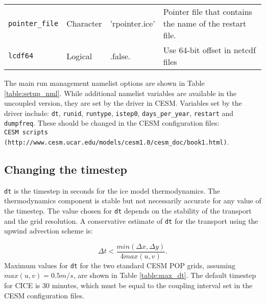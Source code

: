 \begin{table}[ht]
\begin{center}
\begin{tabular}{p{2.0cm}p{2.0cm}p{4.0cm}p{6.5cm}}
{\tt pointer\_file} & Character & 'rpointer.ice' & Pointer file that
                                   contains the name of the restart file. \\

{\tt lcdf64}&  Logical  & .false. & Use 64-bit offset in netcdf files \\

  \hline
  \end{tabular}
  \end{center}
\end{table}

The main run management namelist options are shown in Table 
\ref{table:setup_nml}. While additional namelist variables are available in
the uncoupled version, they are set by the driver in CESM. Variables set by
the driver include: {\tt dt}, {\tt runid}, {\tt runtype}, {\tt istep0}, 
{\tt days\_per\_year}, {\tt restart} and {\tt dumpfreq}. These should be 
changed in the CESM configuration files:\\

  {\tt CESM scripts (http://www.cesm.ucar.edu/models/cesm1.0/cesm\_doc/book1.html)}.\\

\subsection{Changing the timestep}
\label{setup_nml_mgmt}

{\tt dt} is the timestep in seconds for the ice model thermodynamics.
The thermodynamics component is stable but not necessarily accurate for any 
value of the timestep.  The value chosen for {\tt dt} depends on the stability 
of the transport and the grid resolution.  A conservative estimate of {\tt dt} 
for the transport using the upwind advection scheme is:

\begin{equation}
  \Delta t < \frac{min(\Delta x, \Delta y)}{4 max(u, v)} .
\end{equation}
Maximum values for {\tt dt} for the two standard CESM POP grids, assuming 
$max(u,v) = 0.5 m/s$, are shown in Table \ref{table:max_dt}.  The default
timestep for CICE is 30 minutes, which must be equal to the coupling interval
set in the CESM configuration files.

